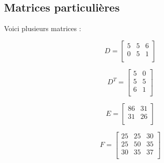 \documentclass[a4paper]{article}\usepackage[]{graphicx}\usepackage[]{xcolor}
\begin{document}
\subsection*{Matrices particulières}

Voici plusieurs matrices :

\begin{minipage}{0.25\linewidth}
    \begin{equation*}
        D = \begin{bmatrix} 5 &5 &6 \\0 &5 &1 \\ \end{bmatrix}
    \end{equation*}
\end{minipage}
\begin{minipage}{0.25\linewidth}
    \begin{equation*}
        D^T = \begin{bmatrix} 5 &0 \\5 &5 \\6 &1 \\ \end{bmatrix}
    \end{equation*}
\end{minipage}
\begin{minipage}{0.25\linewidth}
    \begin{equation*}
        E = \begin{bmatrix} 86 &31 \\31 &26 \\ \end{bmatrix}
    \end{equation*}
\end{minipage}
\begin{minipage}{0.25\linewidth}
    \begin{equation*}
        F = \begin{bmatrix} 25 &25 &30 \\25 &50 &35 \\30 &35 &37 \\ \end{bmatrix}
    \end{equation*}
\end{minipage}
\end{document}
